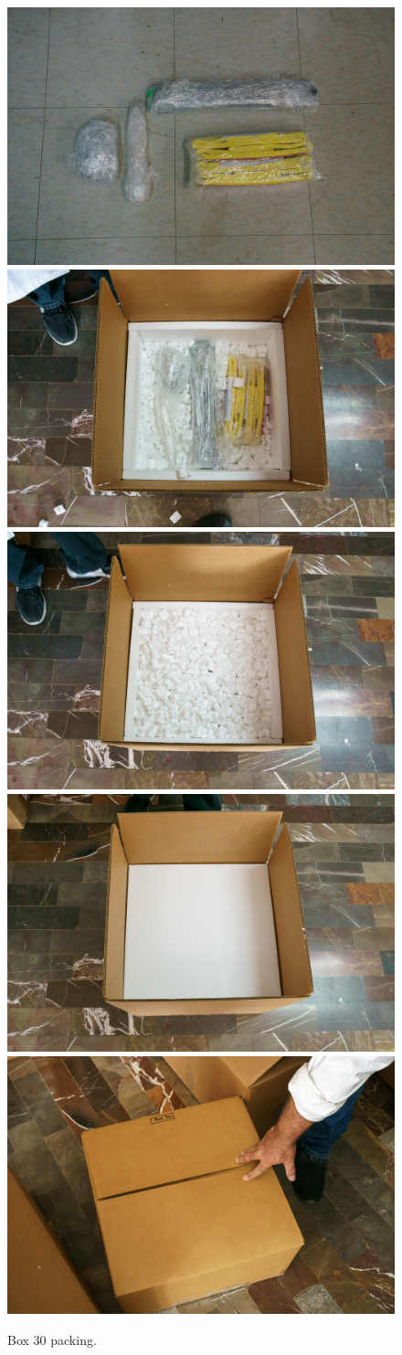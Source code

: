 \documentclass{article}
\begin{document}
\begin{figure}[bp]
\begin{center}
\includegraphics[width=0.40\linewidth]{figures/20201209T112420.jpg}
\includegraphics[width=0.40\linewidth]{figures/20201209T114825.jpg}\\[\smallskipamount]
\includegraphics[width=0.40\linewidth]{figures/20201209T114927.jpg}
\includegraphics[width=0.40\linewidth]{figures/20201209T114939.jpg}\\[\smallskipamount]
\includegraphics[width=0.40\linewidth]{figures/20201209T115134.jpg}
\end{center}
\caption{Box 30 packing.}
\label{figure:box-thirty-packing}
\end{figure}
\end{document}
